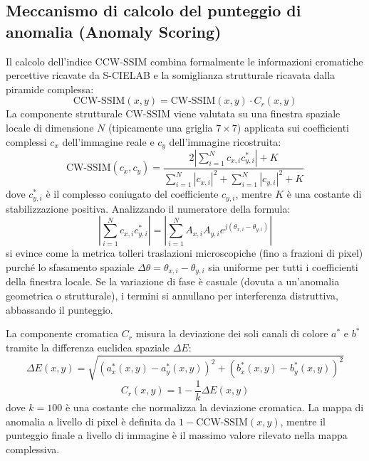 \subsection{Meccanismo di calcolo del punteggio di anomalia (Anomaly Scoring)}
Il calcolo dell'indice CCW-SSIM combina formalmente le informazioni cromatiche percettive ricavate da S-CIELAB e la somiglianza strutturale ricavata dalla piramide complessa:
\begin{equation}
    \text{CCW-SSIM}(x, y) = \text{CW-SSIM}(x, y) \cdot C_r(x, y)
\end{equation}
La componente strutturale $\text{CW-SSIM}$ viene valutata su una finestra spaziale locale di dimensione $N$ (tipicamente una griglia $7 \times 7$) applicata sui coefficienti complessi $c_x$ dell'immagine reale e $c_y$ dell'immagine ricostruita:
\begin{equation}
    \text{CW-SSIM}(c_x, c_y) = \frac{2 \left|\sum_{i=1}^N c_{x,i} c_{y,i}^*\right| + K}{\sum_{i=1}^N |c_{x,i}|^2 + \sum_{i=1}^N |c_{y,i}|^2 + K}
\end{equation}
dove $c_{y,i}^*$ è il complesso coniugato del coefficiente $c_{y,i}$, mentre $K$ è una costante di stabilizzazione positiva. Analizzando il numeratore della formula:
\begin{equation}
    \left|\sum_{i=1}^N c_{x,i} c_{y,i}^*\right| = \left|\sum_{i=1}^N A_{x,i} A_{y,i} e^{j(\theta_{x,i} - \theta_{y,i})}\right|
\end{equation}
si evince come la metrica tolleri traslazioni microscopiche (fino a frazioni di pixel) purché lo sfasamento spaziale $\Delta \theta = \theta_{x,i} - \theta_{y,i}$ sia uniforme per tutti i coefficienti della finestra locale. Se la variazione di fase è casuale (dovuta a un'anomalia geometrica o strutturale), i termini si annullano per interferenza distruttiva, abbassando il punteggio.

La componente cromatica $C_r$ misura la deviazione dei soli canali di colore $a^*$ e $b^*$ tramite la differenza euclidea spaziale $\Delta E$:
\begin{equation}
    \Delta E(x, y) = \sqrt{(a_x^*(x,y) - a_y^*(x,y))^2 + (b_x^*(x,y) - b_y^*(x,y))^2}
\end{equation}
\begin{equation}
    C_r(x, y) = 1 - \frac{1}{k}\Delta E(x, y)
\end{equation}
dove $k=100$ è una costante che normalizza la deviazione cromatica. La mappa di anomalia a livello di pixel è definita da $1 - \text{CCW-SSIM}(x,y)$, mentre il punteggio finale a livello di immagine è il massimo valore rilevato nella mappa complessiva.

